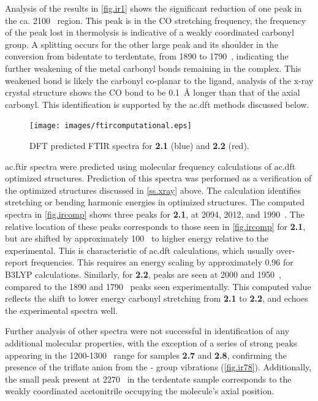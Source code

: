 Analysis of the results in \autoref{fig.ir1} shows the significant reduction of one peak in the ca. 2100~ region. This peak is in the CO stretching frequency, the frequency of the peak lost in thermolysis is indicative of a weakly coordinated carbonyl group. A splitting occurs for the other large peak and its shoulder in the conversion from bidentate to terdentate, from 1890 to 1790~, indicating the further weakening of the metal carbonyl bonds remaining in the complex. This weakened bond is likely the carbonyl co-planar to the ligand, analysis of the x-ray crystal structure shows the CO bond to be 0.1~\r{A} longer than that of the axial carbonyl. This identification is supported by the \gls{ac.dft} methods discussed below.

\begin{figure}[!htb]
 \centering
 \texttt{[image: images/ftircomputational.eps]}
 \caption[DFT predicted FTIR spectra for \textbf{2.1} and \textbf{2.2}.]{DFT predicted FTIR spectra for \textbf{2.1} (blue) and \textbf{2.2} (red).}
 \label{fig.ircomp}
\end{figure}

\Gls{ac.ftir} spectra were predicted using molecular frequency calculations of \gls{ac.dft} optimized structures. Prediction of this spectra was performed as a verification of the optimized structures discussed in \autoref{ss.xray} above. The calculation identifies stretching or bending harmonic energies in optimized structures. The computed spectra in \autoref{fig.ircomp} shows three peaks for \textbf{2.1}, at 2094, 2012, and 1990~. The relative location of these peaks corresponds to those seen in \autoref{fig.ircomp} for \textbf{2.1}, but are shifted by approximately 100~ to higher energy relative to the experimental. This is characteristic of \gls{ac.dft} calculations, which usually over-report frequencies. This requires an energy scaling by approximately 0.96 for B3LYP calculations\autocite{andersson2005}. Similarly, for \textbf{2.2}, peaks are seen at 2000 and 1950~, compared to the 1890 and 1790~ peaks seen experimentally. This computed value reflects the shift to lower energy carbonyl stretching from \textbf{2.1} to \textbf{2.2}, and echoes the experimental spectra well.

Further analysis of other spectra were not successful in identification of any additional molecular properties, with the exception of a series of strong peaks appearing in the 1200-1300~ range for samples \textbf{2.7} and \textbf{2.8}, confirming the presence of the triflate anion from the - group vibrations (\autoref{fig.ir78}). Additionally, the small peak present at 2270~ in the terdentate sample corresponds to the weakly coordinated acetonitrile occupying the molecule's axial position.

